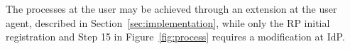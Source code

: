 The processes at the user may be achieved through an extension at the user agent, described in Section~\ref{sec:implementation}, while only the RP initial registration and Step 15 in Figure~\ref{fig:process} requires a modification at IdP.

